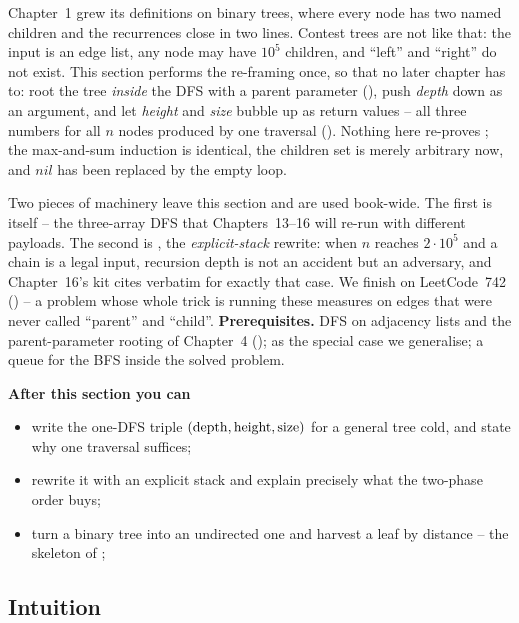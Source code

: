 \begin{topicintro}
Chapter~1 grew its definitions on binary trees, where every node has two named children
and the recurrences close in two lines. Contest trees are not like that: the input is an
edge list, any node may have $10^{5}$ children, and ``left'' and ``right'' do not exist.
This section performs the re-framing once, so that no later chapter has to: root the tree
\emph{inside} the DFS with a parent parameter (), push \emph{depth} down as an
argument, and let \emph{height} and \emph{size} bubble up as return values -- all three
numbers for all $n$ nodes produced by one traversal (). Nothing here
re-proves ; the max-and-sum induction is identical, the
children set is merely arbitrary now, and $\mathit{nil}$ has been replaced by the empty
loop.

Two pieces of machinery leave this section and are used book-wide. The first is
 itself -- the three-array DFS that Chapters~13--16 will re-run with
different payloads. The second is , the \emph{explicit-stack} rewrite:
when $n$ reaches $2\cdot10^{5}$ and a chain is a legal input, recursion depth is not an
accident but an adversary, and Chapter~16's kit cites  verbatim for
exactly that case. We finish on LeetCode~742 () -- a problem whose whole
trick is running these measures on edges that were never called ``parent'' and ``child''.
\textbf{Prerequisites.} DFS on adjacency lists and the parent-parameter rooting of
Chapter~4 ();  as the special case we generalise;
a queue for the BFS inside the solved problem.

\textbf{After this section you can}
\begin{itemize}[nosep]
  \item write the one-DFS triple $(\operatorname{depth},\operatorname{height},\operatorname{size})$ for a general tree cold, and
        state why one traversal suffices; \hfill{}
  \item rewrite it with an explicit stack and explain precisely what the two-phase order
        buys; \hfill{}
  \item turn a binary tree into an undirected one and harvest a leaf by distance -- the
        skeleton of ; \hfill{}
\end{itemize}
\end{topicintro}

\subsection{Intuition}

